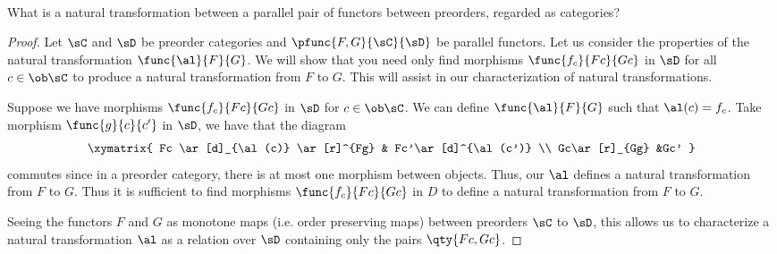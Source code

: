 \documentclass[main.tex]{subfiles}
\begin{document}
\paragraph{}
\begin{exercise}
	What is a natural transformation between a parallel pair of functors between
	preorders, regarded as categories?
\end{exercise}

\begin{proof}
	Let $\sC$ and $\sD$ be preorder categories and $\pfunc{F,G}{\sC}{\sD}$ be
	parallel functors. Let us consider the properties of the natural
	transformation $\func{\al}{F}{G}$. We will show that you need only find
	morphisms $\func{f_{c}}{Fc}{Gc}$ in $\sD$ for all $c \in \ob \sC$ to produce
	a natural transformation from $F$ to $G$. This will assist in our
	characterization of natural transformations.

	Suppose we have morphisms $\func{f_{c}}{Fc}{Gc}$ in $\sD$ for $c \in \ob
	\sC$.  We can define $\func{\al}{F}{G}$ such that $\al(c) = f_{c}$. Take
	morphism $\func{g}{c}{c'}$ in $\sD$, we have that the diagram
	\[\xymatrix{ Fc \ar[d]_{\al(c)} \ar[r]^{Fg} & Fc'\ar[d]^{\al(c')}  \\
	Gc\ar[r]_{Gg} &Gc'   }\]
	commutes since in a preorder category, there is at most one
	morphism between objects. Thus, our $\al$ defines a natural
	transformation from $F$ to $G$. Thus it is sufficient to find morphisms
	$\func{f_{c}}{Fc}{Gc}$ in $D$ to define a natural transformation from
	$F$ to $G$.

	Seeing the functors $F$ and $G$ as monotone maps (i.e. order preserving
	maps) between preorders $\sC$ to $\sD$, this allows us to characterize a
	natural transformation $\al$ as a relation over $\sD$ containing only the
	pairs $\qty{Fc,Gc}$.
\end{proof}
\end{document}
